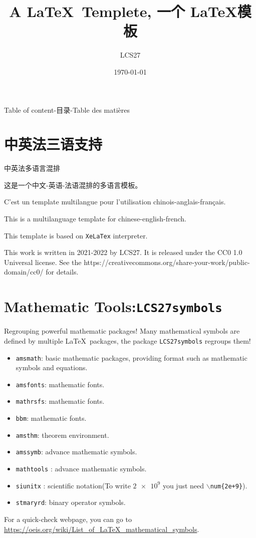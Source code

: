 \documentclass[aspectratio=169]{beamer}
\title{A \LaTeX \ Templete, 一个 \LaTeX 模板}
\author{LCS27}
\institute{Overleaf模板作者}
\date{\today}
\begin{document}
\maketitle

\begin{frame}{Table of content-目录-Table des matières}
\tableofcontents
\end{frame}
\section{中英法三语支持}
\begin{frame}{中英法}{多语言混排}

这是一个中文-英语-法语混排的多语言模板。\par
C'est un template multilangue pour l'utilisation chinois-anglais-français.\par
This is a multilanguage template for chinese-english-french.\par
\par
This template is based on \texttt{XeLaTex} interpreter.\par
This work is written in 2021-2022 by LCS27. It is released under the CC0 1.0 Universal license. See the https://creativecommons.org/share-your-work/public-domain/cc0/ for details.\par
\end{frame}


\section{Mathematic Tools:\texttt{LCS27symbols}}

\begin{frame}{Regrouping powerful mathematic packages!}
Many mathematical symbols are defined by multiple \LaTeX \ packages, the package \texttt{LCS27symbols} regroups them!
\begin{itemize}
\item  \texttt{amsmath}: basic mathematic packages, providing format such as mathematic symbols and equations.
\item  \texttt{amsfonts}: mathematic fonts.
\item  \texttt{mathrsfs}: mathematic fonts.
\item  \texttt{bbm}: mathematic fonts.
\item  \texttt{amsthm}: theorem environment.
\item  \texttt{amssymb}: advance mathematic symbols.
\item  \texttt{mathtools} : advance mathematic symbols.
\item  \texttt{siunitx} : scientific notation(\Eg  To write $\num{2e+9}$ you just need \texttt{$\backslash$num\{2e+9\}}).
\item  \texttt{stmaryrd}: binary operator symbols.
\end{itemize}
For a quick-check webpage, you can go to \url{https://oeis.org/wiki/List_of_LaTeX_mathematical_symbols}.
\end{frame}
\end{document}
